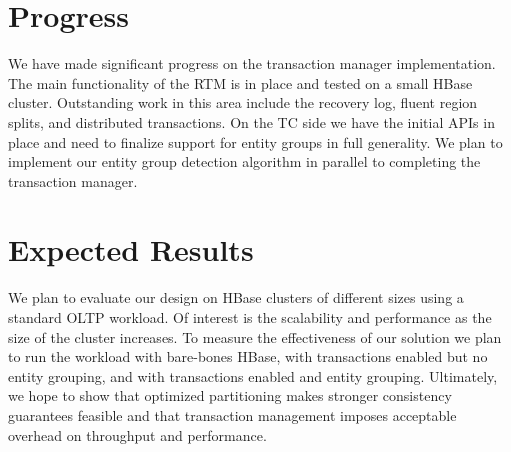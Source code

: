 \documentclass[10pt,final,journal]{IEEEtran}
\begin{document}
\section{Progress}
We have made significant progress on the transaction manager implementation. The main functionality of the RTM is in place and tested on a small HBase cluster. Outstanding work in this area include the recovery log, fluent region splits, and distributed transactions. On the TC side we have the initial APIs in place and need to finalize support for entity groups in full generality. We plan to implement our entity group detection algorithm in parallel to completing the transaction manager.

\section{Expected Results}
We plan to evaluate our design on HBase clusters of different sizes using a standard OLTP workload. Of interest is the scalability and performance as the size of the cluster increases. To measure the effectiveness of our solution we plan to run the workload with bare-bones HBase, with transactions enabled but no entity grouping, and with transactions enabled and entity grouping. Ultimately, we hope to show that optimized partitioning makes stronger consistency guarantees feasible and that transaction management imposes acceptable overhead on throughput and performance.



\end{document}
